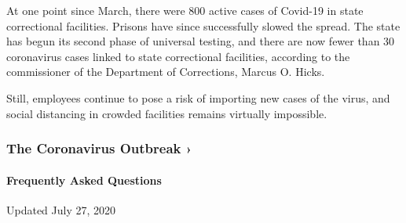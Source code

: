 At one point since March, there were 800 active cases of Covid-19 in
state correctional facilities. Prisons have since successfully slowed
the spread. The state has begun its second phase of universal testing,
and there are now fewer than 30 coronavirus cases linked to state
correctional facilities, according to the commissioner of the Department
of Corrections, Marcus O. Hicks.

Still, employees continue to pose a risk of importing new cases of the
virus, and social distancing in crowded facilities remains virtually
impossible.

\href{https://www.nytimes.com/news-event/coronavirus?action=click\&pgtype=Article\&state=default\&region=MAIN_CONTENT_3\&context=storylines_faq}{}

\hypertarget{the-coronavirus-outbreak-}{%
\subsubsection{The Coronavirus Outbreak
›}\label{the-coronavirus-outbreak-}}

\hypertarget{frequently-asked-questions}{%
\paragraph{Frequently Asked
Questions}\label{frequently-asked-questions}}

Updated July 27, 2020

